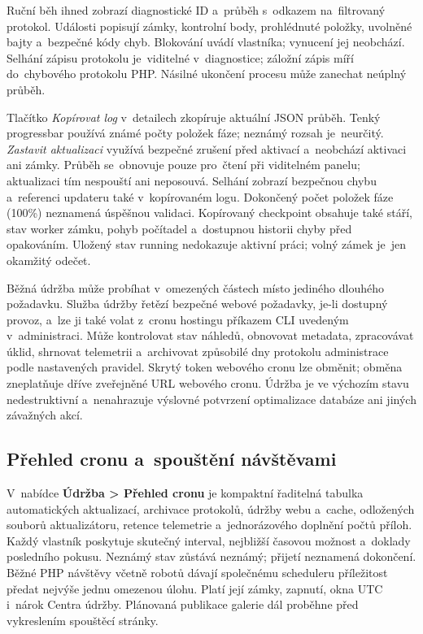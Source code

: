 \documentclass[11pt,a4paper]{article}
\newcommand{\ui}[1]{\textbf{#1}}
\begin{document}
Ruční běh ihned zobrazí diagnostické ID a~průběh s~odkazem na~filtrovaný
protokol.
Události popisují zámky, kontrolní body, prohlédnuté položky, uvolněné bajty
a~bezpečné kódy chyb. Blokování uvádí vlastníka; vynucení jej neobchází.
Selhání zápisu protokolu je~viditelné v~diagnostice; záložní zápis míří
do~chybového protokolu PHP. Násilné ukončení procesu může zanechat neúplný
průběh.

Tlačítko \emph{Kopírovat log} v~detailech zkopíruje aktuální JSON průběh.
Tenký progressbar používá známé počty položek fáze; neznámý rozsah je~neurčitý.
\emph{Zastavit aktualizaci} využívá bezpečné zrušení před aktivací a~neobchází
aktivaci ani zámky. Průběh se~obnovuje pouze pro~čtení při viditelném panelu;
aktualizaci tím nespouští ani neposouvá.
Selhání zobrazí bezpečnou chybu a~referenci updateru také v~kopírovaném logu.
Dokončený počet položek fáze (100\%) neznamená úspěšnou validaci.
Kopírovaný checkpoint obsahuje také stáří, stav worker zámku, pohyb počítadel
a~dostupnou historii chyby před opakováním. Uložený stav running nedokazuje
aktivní práci; volný zámek je~jen okamžitý odečet.

Běžná údržba může probíhat v~omezených částech místo jediného dlouhého
požadavku. Služba údržby řetězí bezpečné webové požadavky, je-li dostupný
provoz, a~lze ji také volat z~cronu hostingu příkazem CLI uvedeným
v~administraci. Může kontrolovat stav náhledů, obnovovat metadata, zpracovávat
úklid, shrnovat telemetrii a~archivovat způsobilé dny protokolu administrace
podle nastavených pravidel. Skrytý token webového cronu lze obměnit; obměna
zneplatňuje dříve zveřejněné URL webového cronu. Údržba je ve výchozím stavu
nedestruktivní a~nenahrazuje výslovné potvrzení optimalizace databáze ani jiných
závažných akcí.
\subsection{Přehled cronu a~spouštění návštěvami}
V~nabídce \ui{Údržba > Přehled cronu} je kompaktní řaditelná tabulka
automatických
aktualizací, archivace protokolů, údržby webu a~cache, odložených souborů
aktualizátoru, retence telemetrie a~jednorázového doplnění počtů příloh.
Každý vlastník poskytuje skutečný interval, nejbližší časovou možnost a~doklady
posledního pokusu. Neznámý stav zůstává neznámý; přijetí neznamená dokončení.
Běžné PHP návštěvy včetně robotů dávají společnému scheduleru příležitost předat
nejvýše jednu omezenou úlohu. Platí její zámky, zapnutí, okna UTC i~nárok Centra
údržby. Plánovaná publikace galerie dál proběhne před vykreslením spouštěcí
stránky.
\end{document}
